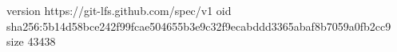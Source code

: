 version https://git-lfs.github.com/spec/v1
oid sha256:5b14d58bce242f99fcae504655b3e9c32f9ecabddd3365abaf8b7059a0fb2cc9
size 43438
